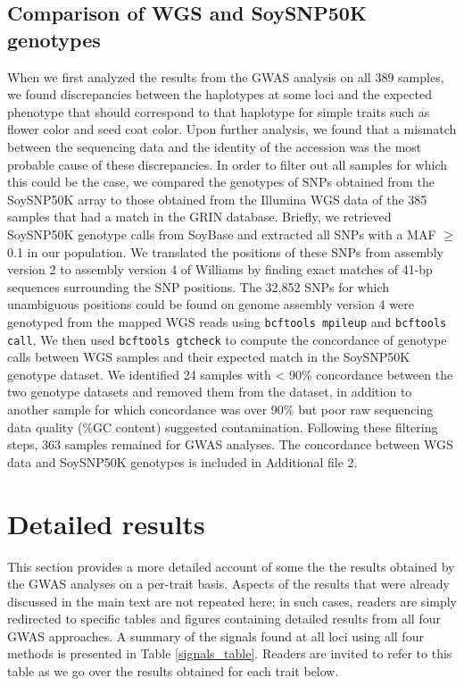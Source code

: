\subsection*{Comparison of WGS and SoySNP50K genotypes}
\label{annexe-sv-gwas-soysnp50k}
When we first analyzed the results from the GWAS analysis on all 389 samples,
we found discrepancies between the haplotypes at some loci and the expected
phenotype that should correspond to that haplotype for simple traits such as
flower color and seed coat color. Upon further analysis, we found that a
mismatch between the sequencing data and the identity of the accession was the
most probable cause of these discrepancies. In order to filter out all samples
for which this could be the case, we compared the genotypes of SNPs obtained
from the SoySNP50K array \cite{song2013} to those obtained from the Illumina WGS
data of the 385 samples that had a match in the GRIN database. Briefly, we
retrieved SoySNP50K genotype calls from SoyBase \citep{grant2010} and extracted
all SNPs with a MAF $\geq$ 0.1 in our population. We translated the positions
of these SNPs from assembly version 2 to assembly version 4 of Williams by
finding exact matches of 41-bp sequences surrounding the SNP positions. The
32,852 SNPs for which unambiguous positions could be found on genome assembly
version 4 were genotyped from the mapped WGS reads using \texttt{bcftools
mpileup} and \texttt{bcftools call}. We then used \texttt{bcftools gtcheck} to
compute the concordance of genotype calls between WGS samples and their
expected match in the SoySNP50K genotype dataset.  We identified 24 samples
with < 90\% concordance between the two genotype datasets and removed them from
the dataset, in addition to another sample for which concordance was over 90\%
but poor raw sequencing data quality (\%GC content) suggested contamination.
Following these filtering steps, 363 samples remained for GWAS analyses. The
concordance between WGS data and SoySNP50K genotypes is included in
Additional file 2.

\section*{Detailed results}
\label{annexe-sv-gwas-detailed-results}

This section provides a more detailed account of some the the results obtained
by the GWAS analyses on a per-trait basis. Aspects of the results that were
already discussed in the main text are not repeated here; in such cases,
readers are simply redirected to specific tables and figures containing
detailed results from all four GWAS approaches. A summary of the signals found
at all loci using all four methods is presented in Table \ref{signals_table}.
Readers are invited to refer to this table as we go over the results obtained
for each trait below.

